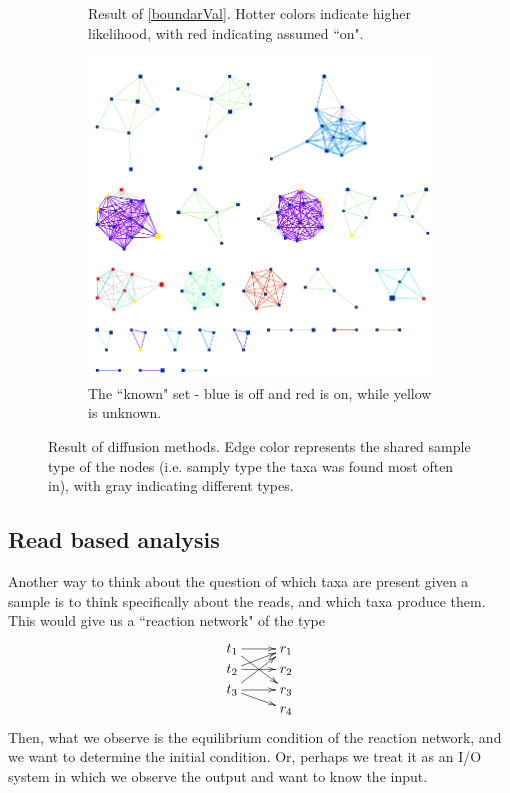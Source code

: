 \documentclass[10pt]{article}
\theoremstyle{definition}
\numberwithin{theorem}{section}
\numberwithin{definition}{section}
\numberwithin{lemma}{section}
\numberwithin{corollary}{section}
\numberwithin{clm}{section}
\numberwithin{rmk}{section}
\begin{document}
\begin{figure}
\begin{center}
\begin{subfigure}[b]{0.48\linewidth}
\begin{center}
	\end{center}
	\caption{Result of \cref{boundarVal}. Hotter colors indicate higher likelihood, with red indicating assumed ``on".}
\end{subfigure}
\begin{subfigure}[b]{0.48\linewidth}
		\begin{center}
		\includegraphics[scale = 0.3]{ranked_known_nodes.png}	
	\end{center}
	\caption{The ``known" set - blue is off and red is on, while yellow is unknown.}
\end{subfigure}
\caption{Result of diffusion methods. Edge color represents the shared sample type of the nodes (i.e. samply type the taxa was found most often in), with gray indicating different types.}\label{diffusion_sample}
\end{center}
\end{figure}	

\subsection{Read based analysis}
Another way to think about the question of which taxa are present given a sample is to think specifically about the reads, and which taxa produce them. This would give us a ``reaction network" of the type 
\[
\xymatrix@R = 1 pt{
t_1 \ar[r] \ar[ddr] & r_1	\\
t_2 \ar[r] \ar[ur] & r_2\\
t_3 \ar[r] \ar[dr] \ar[uur] & r_3\\
 & r_4}
\]
Then, what we observe is the equilibrium condition of the reaction network, and we want to determine the initial condition. Or, perhaps we treat it as an I/O system in which we observe the output and want to know the input.
\end{document}
